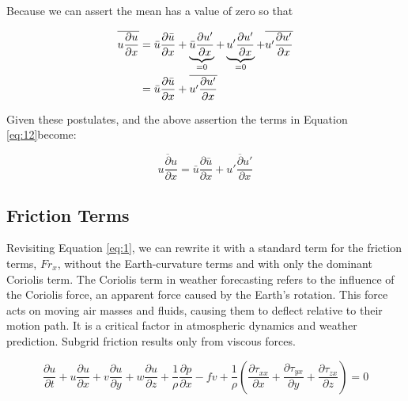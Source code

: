 \documentclass{article}
\begin{document}
Because we can assert the mean has a value of zero so that

\begin{align}
\overline{u\frac{\partial u}{\partial x}} &= \bar{u}\frac{\partial \bar{u}}{\partial x} + \underbrace{\bar{u}\frac{\partial u'}{\partial x}}_{=0} + \underbrace{u'\frac{\partial u'}{\partial x}}_{=0} + \overline{u'\frac{\partial u'}{\partial x}} \notag \\
&= \bar{u}\frac{\partial \bar{u}}{\partial x} + \overline{u'\frac{\partial u'}{\partial x}}
\label{eq:19}
\end{align}

Given these postulates, and the above assertion the terms in Equation \ref{eq:12}become:


\begin{equation}
\overline{u\frac{\partial u}{\partial x}} = \bar{u}\frac{\partial \bar{u}}{\partial x} + \overline{u'\frac{\partial u'}{\partial x}}
\label{eq:20}
\end{equation}

\subsection{Friction Terms}
Revisiting Equation \ref{eq:1}, we can rewrite it with a standard term for the friction terms, $Fr_x$, without the Earth-curvature terms and with only the dominant Coriolis term.  The Coriolis term in weather forecasting refers to the influence of the Coriolis force, an apparent force caused by the Earth’s rotation. This force acts on moving air masses and fluids, causing them to deflect relative to their motion path. It is a critical factor in atmospheric dynamics and weather prediction.  Subgrid friction results only from viscous forces.

\begin{equation}
\frac{\partial u}{\partial t} + u\frac{\partial u}{\partial x} + v\frac{\partial u}{\partial y} + w\frac{\partial u}{\partial z} + \frac{1}{\rho}\frac{\partial p}{\partial x} - fv + \frac{1}{\rho}\left(\frac{\partial \tau_{xx}}{\partial x} + \frac{\partial \tau_{yx}}{\partial y} + \frac{\partial \tau_{zx}}{\partial z}\right) = 0
\label{eq:21}
\end{equation}
\end{document}
